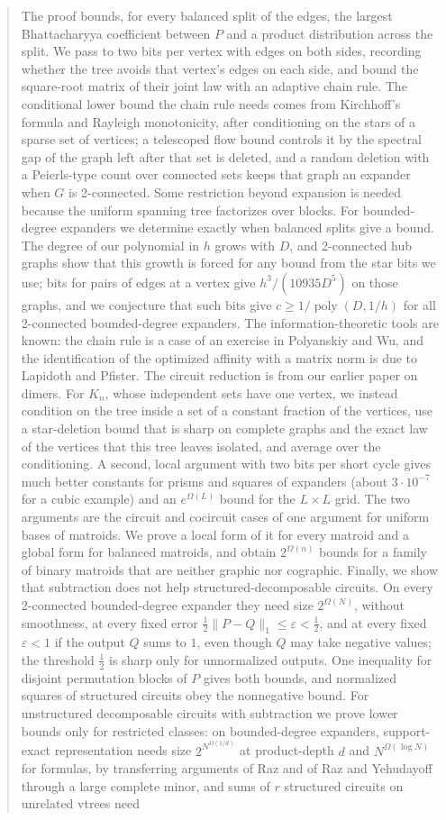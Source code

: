 \documentclass[11pt]{article}
\theoremstyle{definition}
\theoremstyle{remark}
\theoremstyle{plain}
\newcommand{\eps}{\varepsilon}
\newcommand{\norm}[1]{\lVert #1\rVert}
\begin{document}
\begin{abstract}
The proof bounds, for every balanced split of the edges, the largest Bhattacharyya coefficient between $P$ and a product distribution across the split. We pass to two bits per vertex with edges on both sides, recording whether the tree avoids that vertex's edges on each side, and bound the square-root matrix of their joint law with an adaptive chain rule. The conditional lower bound the chain rule needs comes from Kirchhoff's formula and Rayleigh monotonicity, after conditioning on the stars of a sparse set of vertices; a telescoped flow bound controls it by the spectral gap of the graph left after that set is deleted, and a random deletion with a Peierls-type count over connected sets keeps that graph an expander when $G$ is 2-connected. Some restriction beyond expansion is needed because the uniform spanning tree factorizes over blocks. For bounded-degree expanders we determine exactly when balanced splits give a bound. The degree of our polynomial in $h$ grows with $D$, and 2-connected hub graphs show that this growth is forced for any bound from the star bits we use; bits for pairs of edges at a vertex give $h^3/(10935D^5)$ on those graphs, and we conjecture that such bits give $c\ge1/\operatorname{poly}(D,1/h)$ for all 2-connected bounded-degree expanders. The information-theoretic tools are known: the chain rule is a case of an exercise in Polyanskiy and Wu, and the identification of the optimized affinity with a matrix norm is due to Lapidoth and Pfister. The circuit reduction is from our earlier paper on dimers. For $K_n$, whose independent sets have one vertex, we instead condition on the tree inside a set of a constant fraction of the vertices, use a star-deletion bound that is sharp on complete graphs and the exact law of the vertices that this tree leaves isolated, and average over the conditioning. A second, local argument with two bits per short cycle gives much better constants for prisms and squares of expanders (about $3\cdot10^{-7}$ for a cubic example) and an $e^{\Omega(L)}$ bound for the $L\times L$ grid. The two arguments are the circuit and cocircuit cases of one argument for uniform bases of matroids. We prove a local form of it for every matroid and a global form for balanced matroids, and obtain $2^{\Omega(n)}$ bounds for a family of binary matroids that are neither graphic nor cographic. Finally, we show that subtraction does not help structured-decomposable circuits. On every 2-connected bounded-degree expander they need size $2^{\Omega(N)}$, without smoothness, at every fixed error $\frac12\norm{P-Q}_1\le\eps<\frac12$, and at every fixed $\eps<1$ if the output $Q$ sums to $1$, even though $Q$ may take negative values; the threshold $\frac12$ is sharp only for unnormalized outputs. One inequality for disjoint permutation blocks of $P$ gives both bounds, and normalized squares of structured circuits obey the nonnegative bound. For unstructured decomposable circuits with subtraction we prove lower bounds only for restricted classes: on bounded-degree expanders, support-exact representation needs size $2^{N^{\Omega(1/d)}}$ at product-depth $d$ and $N^{\Omega(\log N)}$ for formulas, by transferring arguments of Raz and of Raz and Yehudayoff through a large complete minor, and sums of $r$ structured circuits on unrelated vtrees need 
\end{abstract}
\end{document}
